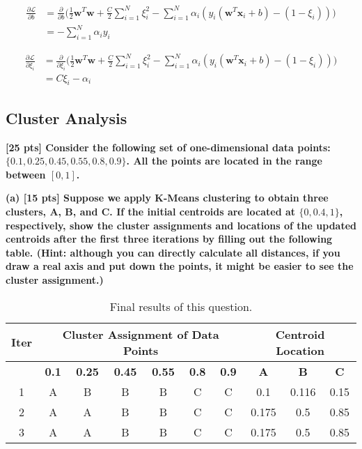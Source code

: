 \begin{align}
  \frac{\partial \mathcal{L}}{\partial b} &= \frac{\partial}{\partial b} \Bigg( \frac{1}{2} \mathbf{w}^T \mathbf{w} + \frac{C}{2} \sum_{i=1}^{N} \xi_i^2 - \sum_{i=1}^{N} \alpha_i \left( y_i (\mathbf{w}^T \mathbf{x}_i + b) - (1 - \xi_i) \right) \Bigg) \nonumber \label{eq:q2_b_2} \\
  &= -\sum_{i=1}^{N} \alpha_i y_i
\end{align}

\begin{align}
  \frac{\partial \mathcal{L}}{\partial \xi_i} &= \frac{\partial}{\partial \xi_i} \Bigg( \frac{1}{2} \mathbf{w}^T \mathbf{w} + \frac{C}{2} \sum_{i=1}^{N} \xi_i^2 - \sum_{i=1}^{N} \alpha_i \left( y_i (\mathbf{w}^T \mathbf{x}_i + b) - (1 - \xi_i) \right) \Bigg) \nonumber \label{eq:q2_b_3} \\
  &= C \xi_i - \alpha_i
\end{align}

\subsection{Cluster Analysis}

\textbf{[25 pts] Consider the following set of one-dimensional data points: $\{0.1, 0.25, 0.45, 0.55, 0.8, 0.9\}$. All the points are located in the range between $[0, 1]$.}

\textbf{(a) [15 pts] Suppose we apply K-Means clustering to obtain three clusters, A, B, and C. If the initial centroids are located at $\{0, 0.4, 1\}$, respectively, show the cluster assignments and locations of the updated centroids after the first three iterations by filling out the following table. (Hint: although you can directly calculate all distances, if you draw a real axis and put down the points, it might be easier to see the cluster assignment.)}

\begin{table}[h]
  \centering
  \begin{tabular}{|c|c|c|c|c|c|c|c|c|c|}
    \hline
    \textbf{Iter} & \multicolumn{6}{c|}{\textbf{Cluster Assignment of Data Points}} & \multicolumn{3}{c|}{\textbf{Centroid Location}} \\ \hline
         & \textbf{0.1} & \textbf{0.25} & \textbf{0.45} & \textbf{0.55} & \textbf{0.8} & \textbf{0.9} & \textbf{A} & \textbf{B} & \textbf{C} \\ \hline
    1    & A    &  B    &  B    &  B    &  C   &  C   & 0.1  & 0.116  & 0.15  \\ \hline
    2    &  A   &  A    &  B    &   B   &  C   &  C   & 0.175  & 0.5  &  0.85 \\ \hline
    3    & A   &  A    &  B    &   B   &  C   &  C   & 0.175  & 0.5  &  0.85 \\ \hline
  \end{tabular}
  \caption{Final results of this question.}
  \label{tbl:q3_a}
\end{table}

